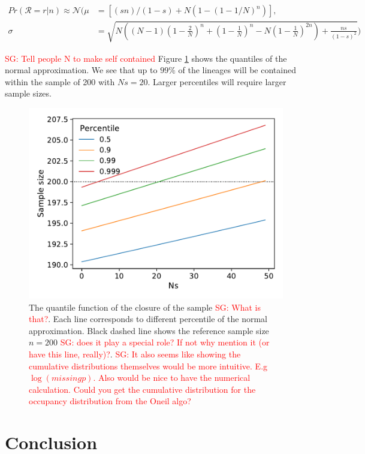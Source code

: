 \documentclass[review]{elsarticle}
\newcommand{\sgcomment}[1]{\textcolor{red}{SG: #1}}
\begin{document}
\begin{align}
  \label{eq:normal-approximation}
  Pr(\mathcal{R}=r|n) \approx \mathcal{N}( \mu &= \left[(s n)/(1 - s) + N (1 - (1 - 1/N)^n)\right],\\
  \sigma &= \sqrt{N \left((N-1) \left(1-\frac{2}{N}\right)^n+\left(1-\frac{1}{N}\right)^n-N\left(1-\frac{1}{N}\right)^{2 n}\right)+\frac{n s}{(1-s)^2}})
\end{align}

\sgcomment{Tell people N to make self contained} Figure \ref{fig:normal-approximation} shows the quantiles of the normal approximation. We see that
up to $99\%$ of the lineages will be contained within the sample of 200 with $Ns=20$. Larger
percentiles will require larger sample sizes.

\begin{figure}
  \centering
  \includegraphics[]{fig/quantile.pdf}
  \caption{The quantile function of the closure of the sample \sgcomment{What is that?}. Each line
    corresponds to different percentile of the normal approximation. Black dashed line shows the
    reference sample size $n=200$ \sgcomment{does it play a special role? If not why mention it (or
      have this line, really)?}. \sgcomment{It also seems like showing the cumulative distributions
      themselves would be more intuitive. E.g $\log(missing p)$. Also would be nice to have the
      numerical calculation. Could you get the cumulative distribution for the occupancy
      distribution from the Oneil algo? }}
  \label{fig:normal-approximation}
\end{figure}


\section{Conclusion}
\label{sec:conclusion}
\end{document}
